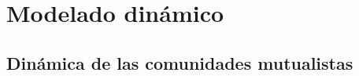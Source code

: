 
\chapter{Modelado dinámico} %

\label{chapterDINAMICA} %


\section{Dinámica de las comunidades mutualistas}


